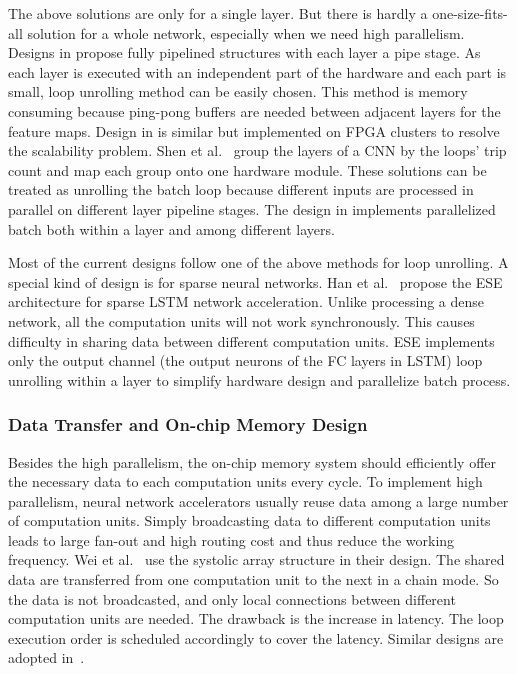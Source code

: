 The above solutions are only for a single layer. But there is hardly a one-size-fits-all solution for a whole network, especially when we need high parallelism. Designs in \cite{li2016high, liu2016automatic} propose fully pipelined structures with each layer a pipe stage. As each layer is executed with an independent part of the hardware and each part is small, loop unrolling method can be easily chosen. This method is memory consuming because ping-pong buffers are needed between adjacent layers for the feature maps. Design in \cite{zhang2016energy} is similar but implemented on FPGA clusters to resolve the scalability problem. Shen et al.~\cite{shen2016overcoming} group the layers of a CNN by the loops' trip count and map each group onto one hardware module. These solutions can be treated as unrolling the batch loop because different inputs are processed in parallel on different layer pipeline stages. The design in \cite{lu2017evaluating} implements parallelized batch both within a layer and among different layers. 

Most of the current designs follow one of the above methods for loop unrolling. A special kind of design is for sparse neural networks. Han et al.~\cite{han2017ese} propose the ESE architecture for sparse LSTM network acceleration. Unlike processing a dense network, all the computation units will not work synchronously. This causes difficulty in sharing data between different computation units. ESE implements only the output channel (the output neurons of the FC layers in LSTM) loop unrolling within a layer to simplify hardware design and parallelize batch process.

\subsubsection{Data Transfer and On-chip Memory Design}

Besides the high parallelism, the on-chip memory system should efficiently offer the necessary data to each computation units every cycle. To implement high parallelism, neural network accelerators usually reuse data among a large number of computation units. Simply broadcasting data to different computation units leads to large fan-out and high routing cost and thus reduce the working frequency. Wei et al.~\cite{wei2017automated} use the systolic array structure in their design. The shared data are transferred from one computation unit to the next in a chain mode. So the data is not broadcasted, and only local connections between different computation units are needed. The drawback is the increase in latency. The loop execution order is scheduled accordingly to cover the latency. Similar designs are adopted in~\cite{aydonat2017opencl, ma2017optimizing}. 

